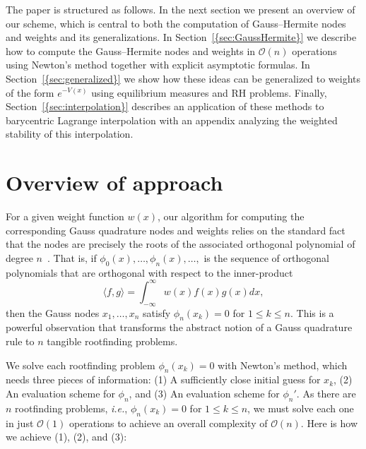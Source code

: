 \documentclass[final]{siamltex}
\begin{document}
The paper is structured as follows. In the next section we present an overview of our scheme, which 
is central to both the computation of 
Gauss--Hermite nodes and weights and its generalizations. In {Section~\ref{{sec:GaussHermite}}} we describe
how to compute the Gauss--Hermite nodes and weights in $\mathcal{O}(n)$ operations using Newton's 
method together with explicit asymptotic formulas. In {Section~\ref{{sec:generalized}}} we show how these 
ideas can be generalized to weights of the form $e^{-V(x)}$ using equilibrium measures and RH problems. 
Finally, {Section~\ref{{sec:interpolation}}} describes an 
application of these methods to barycentric Lagrange interpolation with an appendix analyzing the weighted 
stability of this interpolation.

\section{Overview of approach}
For a given weight function $w(x)$, our algorithm for computing the corresponding Gauss 
quadrature nodes and weights relies on the standard fact that the nodes are 
precisely the roots of the associated orthogonal polynomial of degree $n$~\cite{Gautschi}. That is, 
if $\phi_0(x),\ldots,\phi_n(x),\ldots,$ is the sequence of orthogonal polynomials that are 
orthogonal with respect to the inner-product 
\[
\langle f,g \rangle = \int_{-\infty}^\infty w(x)f(x)g(x) dx,  
\]
then the Gauss nodes $x_1,\ldots,x_n$ satisfy $\phi_n(x_k) = 0$ for $1\leq k\leq n$. 
This is a powerful observation that transforms the abstract notion of a Gauss quadrature
rule to $n$ tangible rootfinding problems.

We solve each rootfinding problem $\phi_n(x_k) = 0$ with Newton's method, which 
needs three pieces of information: (1) A sufficiently close initial guess for $x_k$, (2) 
An evaluation scheme for $\phi_n$, and (3) An evaluation scheme for $\phi_n'$. As there are 
$n$ rootfinding problems, \emph{i.e.}, $\phi_n(x_k)=0$ for $1\leq k\leq n$, we must solve each one
in just $\mathcal{O}(1)$ operations to achieve an overall complexity of $\mathcal{O}(n)$.
Here is how we achieve (1), (2), and (3): 
\end{document}
